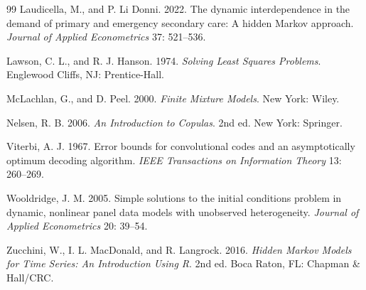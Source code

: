 \documentclass[11pt,a4paper]{article}
\begin{document}
\begin{thebibliography}{99}
Laudicella, M., and P. Li Donni. 2022. The dynamic interdependence in the demand of primary and emergency
secondary care: A hidden Markov approach. \textit{Journal of Applied Econometrics} 37: 521--536.

Lawson, C. L., and R. J. Hanson. 1974. \textit{Solving Least Squares Problems}. Englewood Cliffs, NJ:
Prentice-Hall.

McLachlan, G., and D. Peel. 2000. \textit{Finite Mixture Models}. New York: Wiley.

Nelsen, R. B. 2006. \textit{An Introduction to Copulas}. 2nd ed. New York: Springer.

Viterbi, A. J. 1967. Error bounds for convolutional codes and an asymptotically optimum decoding
algorithm. \textit{IEEE Transactions on Information Theory} 13: 260--269.

Wooldridge, J. M. 2005. Simple solutions to the initial conditions problem in dynamic, nonlinear panel
data models with unobserved heterogeneity. \textit{Journal of Applied Econometrics} 20: 39--54.

Zucchini, W., I. L. MacDonald, and R. Langrock. 2016. \textit{Hidden Markov Models for Time Series: An
Introduction Using R}. 2nd ed. Boca Raton, FL: Chapman \& Hall/CRC.
\end{thebibliography}
\end{document}
